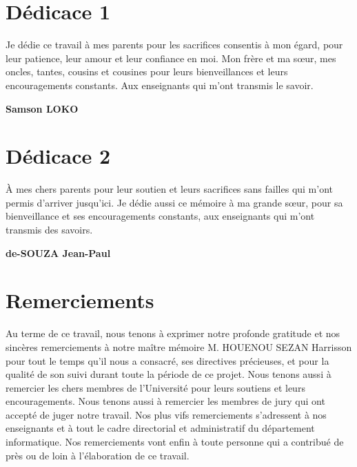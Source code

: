 \documentclass[12pt,a4paper,oneside]{memoir}
\let\cleardoublepage\clearpage
\begin{document}
	\cleardoublepage
	\setcounter{page}{1}
	\pagestyle{chapstyle} %
	
	\chapter*{Dédicace 1}
	\thispagestyle{chapstyle} %
	Je dédie ce travail à mes parents pour les sacrifices consentis à mon
	égard, pour leur patience, leur amour et leur confiance en moi. Mon frère et
	ma sœur, mes oncles, tantes, cousins et cousines pour leurs bienveillances et
	leurs encouragements constants. Aux enseignants qui m’ont transmis le
	savoir.
	
	\begin{flushright}
	\textbf{Samson LOKO}
	\end{flushright}
	
	\cleardoublepage
	\chapter*{Dédicace 2}
	À mes chers parents pour leur soutien et leurs sacrifices sans failles qui
	m’ont permis d’arriver jusqu’ici. Je dédie aussi ce mémoire à ma grande
	sœur, pour sa bienveillance et ses encouragements constants, aux
	enseignants qui m’ont transmis des savoirs.
	
	\begin{flushright}
	\textbf{de-SOUZA Jean-Paul}
	\end{flushright}
	
	\cleardoublepage
	\chapter*{Remerciements}
	Au terme de ce travail, nous tenons à exprimer notre profonde
	gratitude et nos sincères remerciements à notre maître mémoire M. HOUENOU SEZAN Harrisson pour tout le temps qu’il nous a consacré, ses directives précieuses,
	et pour la qualité de son suivi durant toute la période de ce projet. Nous
	tenons aussi à remercier les chers membres de l’Université pour leurs soutiens
	et leurs encouragements. Nous tenons aussi à remercier les membres de jury
	qui ont accepté de juger notre travail. Nos plus vifs remerciements
	s’adressent à nos enseignants et à tout le cadre directorial et administratif du
	département informatique. Nos remerciements vont enfin à toute personne
	qui a contribué de près ou de loin à l’élaboration de ce travail.
	
\end{document}
